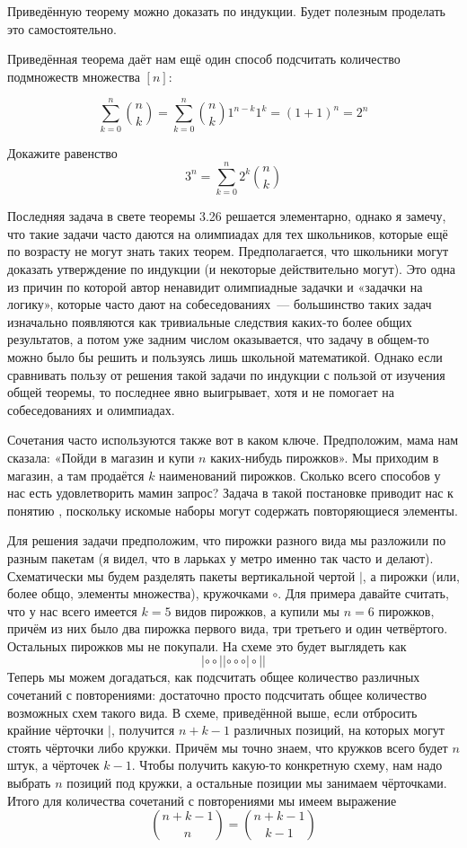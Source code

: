 \begin{exercise}
Приведённую теорему можно доказать по индукции. Будет полезным проделать это самостоятельно.
\end{exercise}

Приведённая теорема даёт нам ещё один способ подсчитать количество подмножеств множества $[n]$:

$$\sum_{k=0}^n {n \choose k} = \sum_{k=0}^n {n \choose k}1^{n-k}1^k = (1+1)^n = 2^n$$

\begin{exercise}
Докажите равенство
$$3^n = \sum_{k=0}^{n} 2^k {n \choose k}$$
\end{exercise}

Последняя задача в свете теоремы 3.26 решается элементарно, однако я замечу, что такие задачи часто даются на олимпиадах для тех школьников, которые ещё по возрасту не могут знать таких теорем. Предполагается, что школьники могут доказать утверждение по индукции (и некоторые действительно могут). Это одна из причин по которой автор ненавидит олимпиадные задачки и «задачки на логику», которые часто дают на собеседованиях~— большинство таких задач изначально появляются как тривиальные следствия каких-то более общих результатов, а потом уже задним числом оказывается, что задачу в общем-то можно было бы решить и пользуясь лишь школьной математикой. Однако если сравнивать пользу от решения такой задачи по индукции с пользой от изучения общей теоремы, то последнее явно выигрывает, хотя и не помогает на собеседованиях и олимпиадах.

Сочетания часто используются также вот в каком ключе. Предположим, мама нам сказала: «Пойди в магазин и купи $n$ каких-нибудь пирожков». Мы приходим в магазин, а там продаётся $k$ наименований пирожков. Сколько всего способов у нас есть удовлетворить мамин запрос? Задача в такой постановке приводит нас к понятию , поскольку искомые наборы могут содержать повторяющиеся элементы.

Для решения задачи предположим, что пирожки разного вида мы разложили по разным пакетам (я видел, что в ларьках у метро именно так часто и делают). Схематически мы будем разделять пакеты вертикальной чертой $|$, а пирожки (или, более общо, элементы множества), кружочками $\circ$. Для примера давайте считать, что у нас всего имеется $k=5$ видов пирожков, а купили мы $n=6$ пирожков, причём из них было два пирожка первого вида, три третьего и один четвёртого. Остальных пирожков мы не покупали. На схеме это будет выглядеть как
$$|\circ\circ||\circ\circ\circ|\circ||$$
Теперь мы можем догадаться, как подсчитать общее количество различных сочетаний с повторениями: достаточно просто подсчитать общее количество возможных схем такого вида. В схеме, приведённой выше, если отбросить крайние чёрточки $|$, получится $n+k-1$ различных позиций, на которых могут стоять чёрточки либо кружки. Причём мы точно знаем, что кружков всего будет $n$ штук, а чёрточек $k-1$. Чтобы получить какую-то конкретную схему, нам надо выбрать $n$ позиций под кружки, а остальные позиции мы занимаем чёрточками. Итого для количества сочетаний с повторениями мы имеем выражение
$${n+k-1 \choose n} = {n+k-1\choose k - 1}$$

